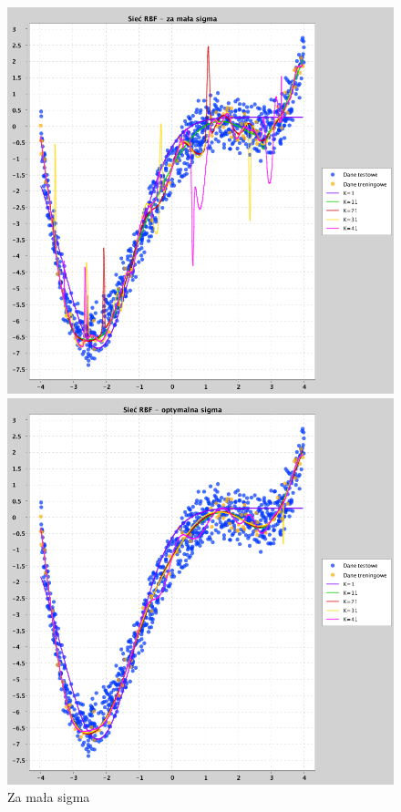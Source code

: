 \documentclass[a4paper, portrait,11pt]{article}
\begin{document}
\begin{figure}[!htb]
  \begin{minipage}{0.33\textwidth}
    \centering
    \includegraphics[width=1\linewidth]{../data/approximation3/1/derivatives/small.png}
    \caption{\label{fig:1smallderivative}Za mała sigma}
  \end{minipage}
  \begin{minipage}{0.33\textwidth}
    \centering
    \includegraphics[width=1\linewidth]{../data/approximation3/1/derivatives/optimal.png}

\end{minipage}
\end{figure}
\end{document}

